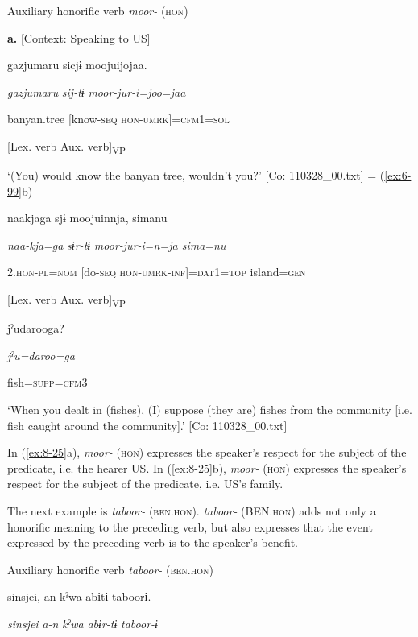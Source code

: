 \textbf{\ea\label{ex:8-25}
}  Auxiliary honorific verb \textit{moor-} (\textsc{hon})

  \textbf{a.}  [Context: Speaking to US]

    {\TM}
\glll  gazjumaru  sicjɨ  moojuijojaa.

      \textit{gazjumaru}  \textit{sij-tɨ}  \textit{moor{}-jur-i=joo=jaa}

      banyan.tree  [know-\textsc{seq}  \textsc{hon}-\textsc{umrk}]=\textsc{cfm1}=\textsc{sol}

        [Lex. verb  Aux. verb]\textsubscript{VP}

\glt ‘(You) would know the banyan tree, wouldn’t you?’ [Co: 110328\_00.txt]
 = (\ref{ex:6-99}b)

    {\TM}
\glll  naakjaga  sjɨ  moojuinnja,  simanu

      \textit{naa-kja=ga}  \textit{sɨr-tɨ}  \textit{moor{}-jur-i=n=ja  sima=nu}

      2.\textsc{hon}-\textsc{pl}=\textsc{nom}  [do-\textsc{seq}  \textsc{hon}-\textsc{umrk}-\textsc{inf}]=\textsc{dat}1=\textsc{top}  island=\textsc{gen}

        [Lex. verb  Aux. verb]\textsubscript{VP}  

      jˀudarooga?

      \textit{jˀu=daroo=ga}

      fish=\textsc{supp}=\textsc{cfm}3

\glt ‘When you dealt in (fishes), (I) suppose (they are) fishes from the community [i.e. fish caught around the community].’ [Co: 110328\_00.txt]
\z

In (\ref{ex:8-25}a), \textit{moor-} (\textsc{hon}) expresses the speaker’s respect for the subject of the predicate, i.e. the hearer US. In (\ref{ex:8-25}b), \textit{moor-} (\textsc{hon}) expresses the speaker’s respect for the subject of the predicate, i.e. US’s family.

  The next example is \textit{taboor-} (\textsc{ben}.\textsc{hon}). \textit{taboor-} (BEN.\textsc{hon}) adds not only a honorific meaning to the preceding verb, but also expresses that the event expressed by the preceding verb is to the speaker’s benefit.

\textbf{\ea\label{ex:8-26}
}  Auxiliary honorific verb \textit{taboor-} (\textsc{ben}.\textsc{hon})

  {\TM}
\glll  {\textbar}sinsjei{\textbar},  an  kˀwa  abɨtɨ  taboorɨ.

    \textit{sinsjei}  \textit{a-n}  \textit{kˀwa}  \textit{abɨr-tɨ}  \textit{taboor{}-ɨ}

